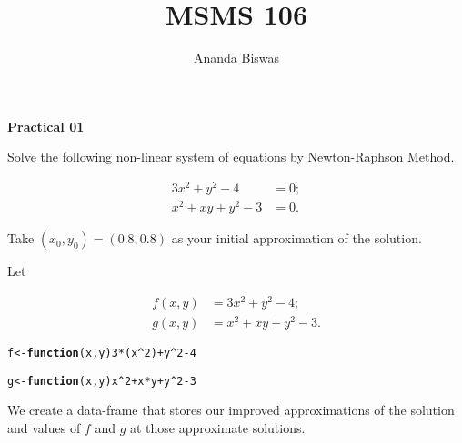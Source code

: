 \documentclass[11pt, a4paper]{article}\usepackage[]{graphicx}\usepackage[]{xcolor}
\title{MSMS 106}
\author{Ananda Biswas}
\date{}
\makeatletter
\newcommand{\hlnum}[1]{\textcolor[rgb]{0.686,0.059,0.569}{#1}}%
\newcommand{\hlopt}[1]{\textcolor[rgb]{0,0,0}{#1}}%
\newcommand{\hldef}[1]{\textcolor[rgb]{0.345,0.345,0.345}{#1}}%
\newcommand{\hlkwa}[1]{\textcolor[rgb]{0.161,0.373,0.58}{\textbf{#1}}}%
\newcommand{\hlkwb}[1]{\textcolor[rgb]{0.69,0.353,0.396}{#1}}%
\newcommand{\hlkwc}[1]{\textcolor[rgb]{0.333,0.667,0.333}{#1}}%
\newenvironment{kframe}{%
 \def\at@end@of@kframe{}%
 \ifinner\ifhmode%
  \def\at@end@of@kframe{\end{minipage}}%
  \begin{minipage}{\columnwidth}%
 \fi\fi%
 \def\FrameCommand##1{\hskip\@totalleftmargin \hskip-\fboxsep
 \colorbox{shadecolor}{##1}\hskip-\fboxsep
     \hskip-\linewidth \hskip-\@totalleftmargin \hskip\columnwidth}%
 \MakeFramed {\advance\hsize-\width
   \@totalleftmargin\z@ \linewidth\hsize
   \@setminipage}}%
 {\par\unskip\endMakeFramed%
 \at@end@of@kframe}
\newenvironment{knitrout}{}{} %
\makeatother
\begin{document}
\maketitle

\begin{center}
\textbf{Practical 01}
\end{center}

\smallpencil \hspace{0.5cm} Solve the following non-linear system of equations by Newton-Raphson Method.

\begin{align*}
  3x^2 + y^2 - 4 &= 0; \\
  x^2 + xy + y^2 - 3 &= 0.
\end{align*}

Take $(x_0, y_0) = (0.8, 0.8)$ as your initial approximation of the solution.

\vspace{0.5cm}

\faArrowAltCircleRight[regular] \hspace{0.5cm} Let

\begin{align*}
  f(x, y) &= 3x^2 + y^2 - 4 ; \\
  g(x, y) &= x^2 + xy + y^2 - 3 .
\end{align*}


\begin{knitrout}\footnotesize
{}\color{fgcolor}\begin{kframe}
\begin{alltt}
\hldef{f} \hlkwb{<-} \hlkwa{function}\hldef{(}\hlkwc{x}\hldef{,} \hlkwc{y}\hldef{)} \hlnum{3}\hlopt{*}\hldef{(x}\hlopt{^}\hlnum{2}\hldef{)} \hlopt{+} \hldef{y}\hlopt{^}\hlnum{2} \hlopt{-} \hlnum{4}

\hldef{g} \hlkwb{<-} \hlkwa{function}\hldef{(}\hlkwc{x}\hldef{,} \hlkwc{y}\hldef{) x}\hlopt{^}\hlnum{2} \hlopt{+} \hldef{x}\hlopt{*}\hldef{y} \hlopt{+} \hldef{y}\hlopt{^}\hlnum{2} \hlopt{-} \hlnum{3}
\end{alltt}
\end{kframe}
\end{knitrout}

We create a data-frame that stores our improved approximations of the solution and values of $f$ and $g$ at those approximate solutions.
\end{document}
